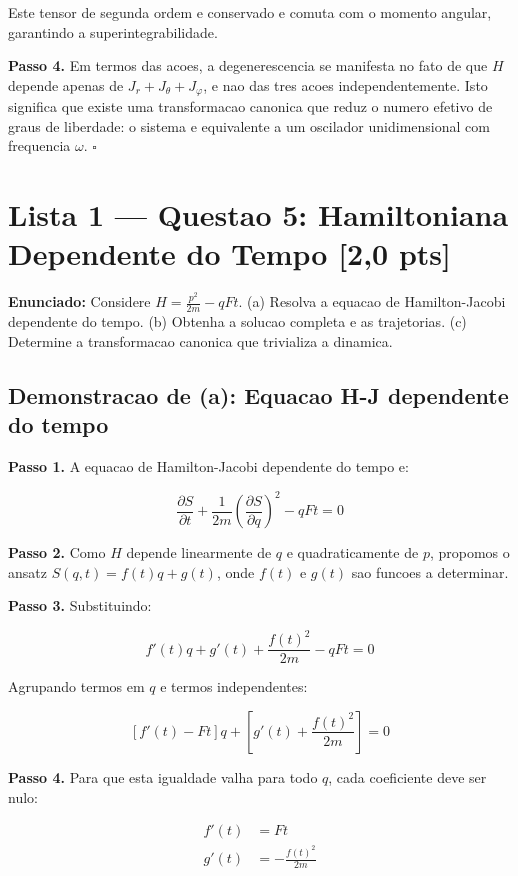 \documentclass[12pt,a4paper,oneside]{article}
\begin{document}
Este tensor de segunda ordem e conservado e comuta com o momento angular,
garantindo a superintegrabilidade.

\textbf{Passo 4.} Em termos das acoes, a degenerescencia se manifesta no
fato de que $H$ depende apenas de $J_r + J_\theta + J_\varphi$, e nao das
tres acoes independentemente. Isto significa que existe uma transformacao
canonica que reduz o numero efetivo de graus de liberdade: o sistema e
equivalente a um oscilador unidimensional com frequencia $\omega$. $\square$

\newpage
\section{Lista 1 — Questao 5: Hamiltoniana Dependente do Tempo [2,0 pts]}

\textbf{Enunciado:} Considere $H = \frac{p^2}{2m} - qFt$.
(a) Resolva a equacao de Hamilton-Jacobi dependente do tempo.
(b) Obtenha a solucao completa e as trajetorias.
(c) Determine a transformacao canonica que trivializa a dinamica.

\subsection*{Demonstracao de (a): Equacao H-J dependente do tempo}

\textbf{Passo 1.} A equacao de Hamilton-Jacobi dependente do tempo e:

$$\frac{\partial S}{\partial t} + \frac{1}{2m}\left(\frac{\partial S}
{\partial q}\right)^2 - qFt = 0$$

\textbf{Passo 2.} Como $H$ depende linearmente de $q$ e quadraticamente de
$p$, propomos o ansatz $S(q,t) = f(t)q + g(t)$, onde $f(t)$ e $g(t)$ sao
funcoes a determinar.

\textbf{Passo 3.} Substituindo:

$$f'(t)q + g'(t) + \frac{f(t)^2}{2m} - qFt = 0$$

Agrupando termos em $q$ e termos independentes:

$$[f'(t) - Ft]q + \left[g'(t) + \frac{f(t)^2}{2m}\right] = 0$$

\textbf{Passo 4.} Para que esta igualdade valha para todo $q$, cada
coeficiente deve ser nulo:

\begin{align}
f'(t) &= Ft \label{eq:ht_f} \\
g'(t) &= -\frac{f(t)^2}{2m} \label{eq:ht_g}
\end{align}
\end{document}
